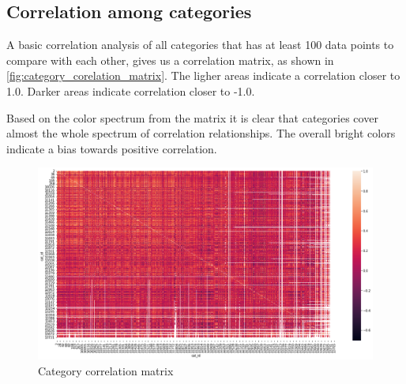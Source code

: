 \subsection{Correlation among categories}
A basic correlation analysis of all categories that has at least 100 data points to compare with each other,
gives us a correlation matrix, as shown in \autoref{fig:category_corelation_matrix}.
The ligher areas indicate a correlation closer to 1.0.
Darker areas indicate correlation closer to -1.0.

Based on the color spectrum from the matrix it is clear that categories cover almost the whole spectrum of correlation relationships.
The overall bright colors indicate a bias towards positive correlation.

  \begin{figure}[h!]
      \centering
      \includegraphics[width=\textwidth]{./figs/code_generated/data_exploration/category_correlation_matrix.png}
      \hfill
      \caption{Category correlation matrix}
      \label{fig:category_corelation_matrix}
  \end{figure}





